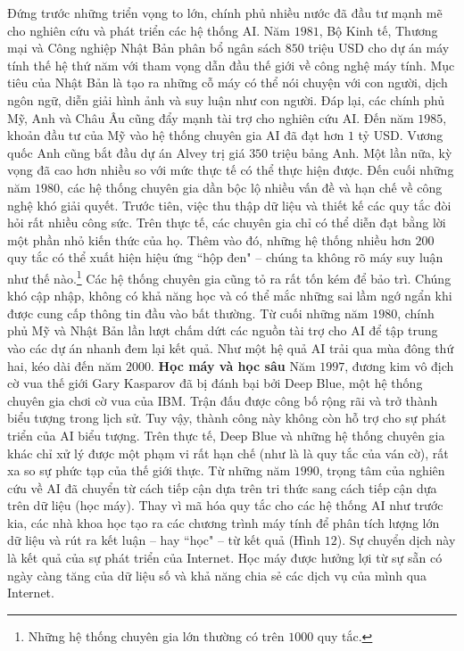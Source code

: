 \begin{multicols}{2}
	\vskip 0.1cm
	Đứng trước những triển vọng to lớn, chính phủ nhiều nước đã đầu tư mạnh mẽ cho nghiên cứu và phát triển các hệ thống AI. Năm $1981$, Bộ Kinh tế, Thương mại và Công nghiệp Nhật Bản phân bổ ngân sách $850$ triệu USD cho dự án máy tính thế hệ thứ năm với tham vọng dẫn đầu thế giới về công nghệ máy tính. Mục tiêu của Nhật Bản là tạo ra những cỗ máy có thể nói chuyện với con người, dịch ngôn ngữ, diễn giải hình ảnh và suy luận như con người. Đáp lại, các chính phủ Mỹ, Anh và Châu Âu cũng đẩy mạnh tài trợ cho nghiên cứu AI. Đến năm $1985$, khoản đầu tư của Mỹ vào hệ thống chuyên gia AI đã đạt hơn $1$ tỷ USD. Vương quốc Anh cũng bắt đầu dự án Alvey trị giá $350$ triệu bảng Anh.
	\vskip 0.1cm
	Một lần nữa, kỳ vọng đã cao hơn nhiều so với mức thực tế có thể thực hiện được. Đến cuối những năm $1980$, các hệ thống chuyên gia dần bộc lộ nhiều vấn đề và hạn chế về công nghệ khó giải quyết. Trước tiên, việc thu thập dữ liệu và thiết kế các quy tắc đòi hỏi rất nhiều công sức. Trên thực tế, các chuyên gia chỉ có thể diễn đạt bằng lời một phần nhỏ kiến thức của họ. Thêm vào đó, những hệ thống nhiều hơn $200$ quy tắc có thể xuất hiện hiệu ứng ``hộp đen" -- chúng ta không rõ máy suy luận như thế nào.\footnote{\color{cackithi}Những hệ thống chuyên gia lớn thường có trên $1000$ quy tắc.} Các hệ thống chuyên gia cũng tỏ ra rất tốn kém để bảo trì. Chúng khó cập nhập, không có khả năng học và có thể mắc những sai lầm ngớ ngẩn khi được cung cấp thông tin đầu vào bất thường. 
	\vskip 0.1cm
	Từ cuối những năm $1980$, chính phủ Mỹ và Nhật Bản lần lượt chấm dứt các nguồn tài trợ cho AI để tập trung vào các dự án nhanh đem lại kết quả. Như một hệ quả AI trải qua mùa đông thứ hai, kéo dài đến năm $2000$.
	\vskip 0.1cm
	\textbf{\color{cackithi}Học máy và học sâu}
	\vskip 0.1cm
	Năm $1997$, đương kim vô địch cờ vua thế giới Gary Kasparov đã bị đánh bại bởi Deep Blue, một hệ thống chuyên gia chơi cờ vua của IBM. Trận đấu được công bố rộng rãi và trở thành biểu tượng trong lịch sử. Tuy vậy, thành công này không còn hỗ trợ cho sự phát triển của AI biểu tượng. Trên thực tế, Deep Blue và những hệ thống chuyên gia khác chỉ xử lý được một phạm vi rất hạn chế (như là là quy tắc của ván cờ), rất xa so sự phức tạp của thế giới thực.
	\vskip 0.1cm
	Từ những năm $1990$, trọng tâm của nghiên cứu về AI đã chuyển từ cách tiếp cận dựa trên tri thức sang cách tiếp cận dựa trên dữ liệu (học máy). Thay vì mã hóa quy tắc cho các hệ thống AI như trước kia, các nhà khoa học tạo ra các chương trình máy tính để phân tích lượng lớn dữ liệu và rút ra kết luận -- hay ``học" -- từ kết quả (Hình $12$). Sự chuyển dịch này là kết quả của sự phát triển của Internet. Học máy được hưởng lợi từ sự sẵn có ngày càng tăng của dữ liệu số và khả năng chia sẻ các dịch vụ của mình qua Internet. 

\end{multicols}

